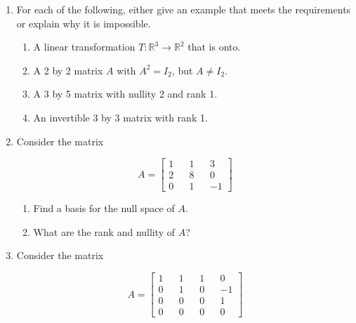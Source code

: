 \documentclass[12 pt]{report}
\begin{document}
\begin{enumerate}

\item For each of the following, either give an example that meets the requirements or explain why it is impossible. 

\begin{enumerate} \item A linear transformation $T: \mathbb{R}^3 \to \mathbb{R}^2$ that is onto. 

\vfill

\item A 2 by 2 matrix $A$ with $A^2 = I_2$, but $A \neq I_2$. 

\vfill

\item A 3 by 5 matrix with nullity 2 and rank 1. 

\vfill

\item An invertible 3 by 3 matrix with rank 1. 

\vfill

\end{enumerate}

\newpage

\item Consider the matrix 

\[
A = \begin{bmatrix} 1 && 1 && 3 \\ 2 && 8 && 0 \\ 0 && 1 && -1 \end{bmatrix}
\]

\begin{enumerate}
\item Find a basis for the null space of $A$. 

\vfill

\item What are the rank and nullity of $A$?

\vfill 

\end{enumerate}

\newpage

\item Consider the matrix 

\[
A = \begin{bmatrix} 1 && 1 && 1 && 0 \\ 0 && 1 && 0 && -1 \\ 0 && 0 && 0 && 1  \\ 0 && 0 && 0 && 0 \end{bmatrix}
\]


\end{enumerate}
\end{document}
